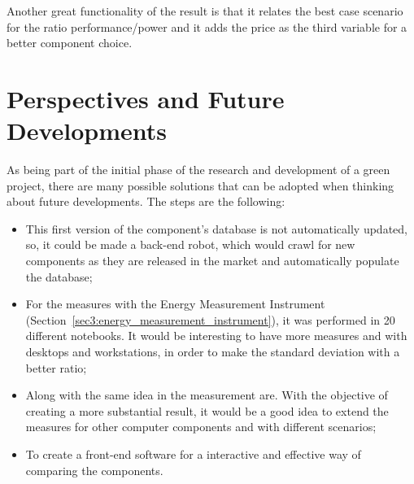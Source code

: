     
    Another great functionality of the result is that it relates the best case scenario for the ratio performance/power and it adds the price as the third variable for a better component choice.
    
    \pagebreak
    \section{Perspectives and Future Developments}

        As being part of the initial phase of the research and development of a green project, there are many possible solutions that can be adopted when thinking about future developments. The steps are the following:
    \begin{itemize}
	    \item This first version of the component's database is not automatically updated, so, it could be made a back-end robot, which would crawl for new components as they are released in the market and automatically populate the database;
	    \item For the measures with the Energy Measurement Instrument (Section~\ref{sec3:energy_measurement_instrument}), it was performed in 20 different notebooks. It would be interesting to have more measures and with desktops and workstations, in order to make the standard deviation with a better ratio;
	    \item Along with the same idea in the measurement are. With the objective of creating a more substantial result, it would be a good idea to extend the measures for other computer components and with different scenarios;
	    \item To create a front-end software for a interactive and effective way of comparing the components.
    \end{itemize}







